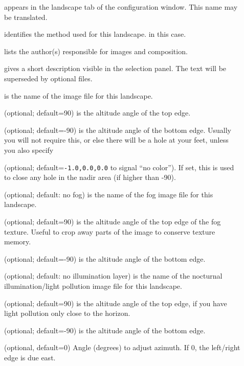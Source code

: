 \begin{description}
\item[] appears in the landscape tab of the configuration window. This name may be translated.
\item[] identifies the method used for this
  landscape.  in this case.
\item[] lists the author(s) responsible for images and
  composition.
\item[] gives a short description visible in the
  selection panel. The text will be superseded by optional
   files.
\item[] is the name of the image file for this landscape.
\item[] (optional; default=90) is the altitude angle
  of the top edge.
\item[] (optional; default=-90) is the altitude
  angle of the bottom edge. Usually you will not require this, or else
  there will be a hole at your feet, unless you also specify
\item[] (optional;
  default=\texttt{-1.0,0.0,0.0} to signal ``no color''). If set, this
  is used to close any hole in the nadir area (if 
  higher than -90). 
\item[] (optional; default: no fog) is the name of
  the fog image file for this landscape.
\item[] (optional; default=90) is the altitude
  angle of the top edge of the fog texture. Useful to crop away parts
  of the image to conserve texture memory.
\item[] (optional; default=-90) is the
  altitude angle of the bottom edge.
\item[] (optional; default: no illumination layer)
  is the name of the nocturnal illumination/light pollution image file
  for this landscape.
\item[] (optional; default=90) is the altitude
  angle of the top edge, if you have light pollution only close to the
  horizon.
\item[] (optional; default=-90) is the
  altitude angle of the bottom edge.
\item[] (optional, default=0) Angle (degrees) to
  adjust azimuth. If 0, the left/right edge is due east.

\end{description}
